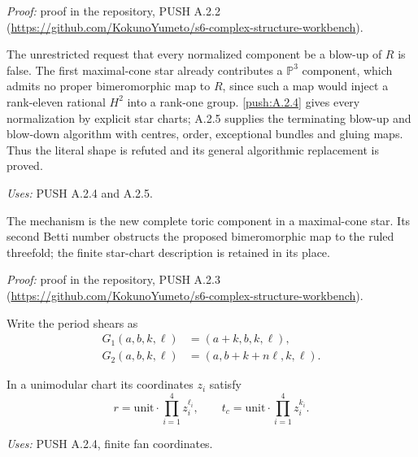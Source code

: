 \noindent\emph{Proof:} proof in the repository, PUSH A.2.2 (\url{https://github.com/KokunoYumeto/s6-complex-structure-workbench}).

\begin{announcement}[PUSH A.2.3; A]\label{push:A.2.3}
The unrestricted request that every normalized component
be a blow-up of $R$ is false. The first maximal-cone
star already contributes a $\mathbb P^3$ component,
which admits no proper bimeromorphic map to $R$, since
such a map would inject a rank-eleven rational $H^2$
into a rank-one group. \ref{push:A.2.4} gives every normalization
by explicit star charts; A.2.5 supplies the terminating
blow-up and blow-down algorithm with centres, order,
exceptional bundles and gluing maps. Thus the literal
shape is refuted and its general algorithmic
replacement is proved.
\end{announcement}
\noindent\emph{Uses:} PUSH A.2.4 and A.2.5.\par

The mechanism is the new complete toric component in a maximal-cone star. Its second Betti number obstructs the proposed bimeromorphic map to the ruled threefold; the finite star-chart description is retained in its place.

\noindent\emph{Proof:} proof in the repository, PUSH A.2.3 (\url{https://github.com/KokunoYumeto/s6-complex-structure-workbench}).

\begin{definition}\label{push:A.2.periods}
Write the period shears as
\begin{align*}
 G_1(a,b,k,\ell)&=(a+k,b,k,\ell),\\
 G_2(a,b,k,\ell)&=(a,b+k+n\ell,k,\ell).
\end{align*}

In a unimodular chart its
coordinates $z_i$ satisfy
\[
 r=\text{unit}\cdot\prod_{i=1}^4 z_i^{\ell_i},
 \qquad t_c=\text{unit}\cdot\prod_{i=1}^4 z_i^{k_i}.
 \tag{A.24d}
\]
\end{definition}
\noindent\emph{Uses:} PUSH A.2.4, finite fan coordinates.\par

